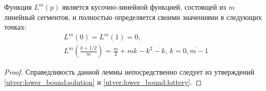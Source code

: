 \begin{lemma}
\label{lemma:lower_bound:function}
Функция $ L^m(p) $ является кусочно-линейной функцией, состоящей из $ m $ линейный сегментов, и полностью определяется своими значениями в следующих точках:
\begin{eqnarray*}
& L^m(0) = L^m(1) = 0, \\
& L^m\left(\frac{k+1/2}{m}\right) 
    = \frac{m}{2} + mk - k^2 - k, 
        \, k = \overline{0, m - 1}
\end{eqnarray*}
\end{lemma}
\begin{proof}
Справедливость данной леммы непосредственно следует из утверждений \ref{utver:lower_bound:solution} и \ref{utver:lower_bound:lottery}.
\end{proof}